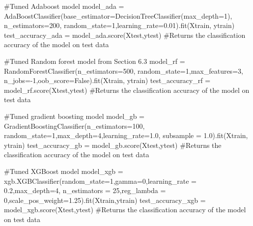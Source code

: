 \documentclass[
  letterpaper,
  DIV=11,
  numbers=noendperiod]{scrreprt}
\newenvironment{Shaded}{\begin{snugshade}}{\end{snugshade}}
\newcommand{\CommentTok}[1]{\textcolor[rgb]{0.37,0.37,0.37}{#1}}
\newcommand{\DecValTok}[1]{\textcolor[rgb]{0.68,0.00,0.00}{#1}}
\newcommand{\FloatTok}[1]{\textcolor[rgb]{0.68,0.00,0.00}{#1}}
\newcommand{\NormalTok}[1]{\textcolor[rgb]{0.00,0.23,0.31}{#1}}
\newcommand{\OperatorTok}[1]{\textcolor[rgb]{0.37,0.37,0.37}{#1}}
\newcommand{\VariableTok}[1]{\textcolor[rgb]{0.07,0.07,0.07}{#1}}
\begin{document}
\begin{Shaded}
\begin{Highlighting}[]
\CommentTok{\#Tuned Adaboost model}
\NormalTok{model\_ada }\OperatorTok{=}\NormalTok{ AdaBoostClassifier(base\_estimator}\OperatorTok{=}\NormalTok{DecisionTreeClassifier(max\_depth}\OperatorTok{=}\DecValTok{1}\NormalTok{), n\_estimators}\OperatorTok{=}\DecValTok{200}\NormalTok{, }
\NormalTok{                               random\_state}\OperatorTok{=}\DecValTok{1}\NormalTok{,learning\_rate}\OperatorTok{=}\FloatTok{0.01}\NormalTok{).fit(Xtrain, ytrain)    }
\NormalTok{test\_accuracy\_ada }\OperatorTok{=}\NormalTok{ model\_ada.score(Xtest,ytest) }\CommentTok{\#Returns the classification accuracy of the model on test data}
    
\CommentTok{\#Tuned Random forest model from Section 6.3}
\NormalTok{model\_rf }\OperatorTok{=}\NormalTok{ RandomForestClassifier(n\_estimators}\OperatorTok{=}\DecValTok{500}\NormalTok{, random\_state}\OperatorTok{=}\DecValTok{1}\NormalTok{,max\_features}\OperatorTok{=}\DecValTok{3}\NormalTok{,}
\NormalTok{                        n\_jobs}\OperatorTok{={-}}\DecValTok{1}\NormalTok{,oob\_score}\OperatorTok{=}\VariableTok{False}\NormalTok{).fit(Xtrain, ytrain)}
\NormalTok{test\_accuracy\_rf }\OperatorTok{=}\NormalTok{ model\_rf.score(Xtest,ytest) }\CommentTok{\#Returns the classification accuracy of the model on test data}
    
\CommentTok{\#Tuned gradient boosting model}
\NormalTok{model\_gb }\OperatorTok{=}\NormalTok{ GradientBoostingClassifier(n\_estimators}\OperatorTok{=}\DecValTok{100}\NormalTok{, random\_state}\OperatorTok{=}\DecValTok{1}\NormalTok{,max\_depth}\OperatorTok{=}\DecValTok{4}\NormalTok{,learning\_rate}\OperatorTok{=}\FloatTok{1.0}\NormalTok{,}
\NormalTok{                                     subsample }\OperatorTok{=} \FloatTok{1.0}\NormalTok{).fit(Xtrain, ytrain)}
\NormalTok{test\_accuracy\_gb }\OperatorTok{=}\NormalTok{ model\_gb.score(Xtest,ytest) }\CommentTok{\#Returns the classification accuracy of the model on test data}

\CommentTok{\#Tuned XGBoost model}
\NormalTok{model\_xgb }\OperatorTok{=}\NormalTok{ xgb.XGBClassifier(random\_state}\OperatorTok{=}\DecValTok{1}\NormalTok{,gamma}\OperatorTok{=}\DecValTok{0}\NormalTok{,learning\_rate }\OperatorTok{=} \FloatTok{0.2}\NormalTok{,max\_depth}\OperatorTok{=}\DecValTok{4}\NormalTok{,}
\NormalTok{                              n\_estimators }\OperatorTok{=} \DecValTok{25}\NormalTok{,reg\_lambda }\OperatorTok{=} \DecValTok{0}\NormalTok{,scale\_pos\_weight}\OperatorTok{=}\FloatTok{1.25}\NormalTok{).fit(Xtrain,ytrain)}
\NormalTok{test\_accuracy\_xgb }\OperatorTok{=}\NormalTok{ model\_xgb.score(Xtest,ytest) }\CommentTok{\#Returns the classification accuracy of the model on test data}


\end{Highlighting}
\end{Shaded}
\end{document}
